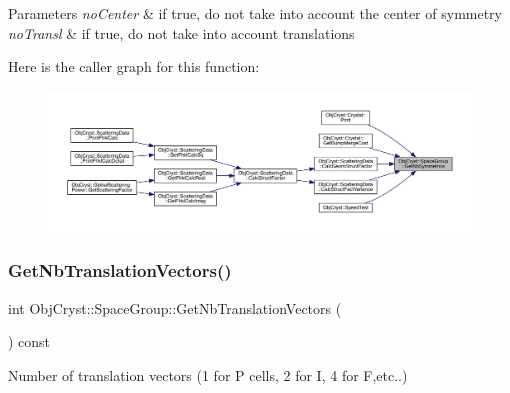 \begin{DoxyParams}{Parameters}
{\em no\+Center} & if \textquotesingle{}true\textquotesingle{}, do not take into account the center of symmetry \\
\hline
{\em no\+Transl} & if \textquotesingle{}true\textquotesingle{}, do not take into account translations \\
\hline
\end{DoxyParams}
Here is the caller graph for this function\+:
\nopagebreak
\begin{figure}[H]
\begin{center}
\leavevmode
\includegraphics[width=350pt]{class_obj_cryst_1_1_space_group_a3790c6c41b59e2584c48f62ab1766bec_icgraph}
\end{center}
\end{figure}
\mbox{\label{class_obj_cryst_1_1_space_group_ab29b2dbdb97ed82c9b609c7f59a3e656}} 
\subsubsection{\texorpdfstring{GetNbTranslationVectors()}{GetNbTranslationVectors()}}
{\footnotesize\ttfamily int Obj\+Cryst\+::\+Space\+Group\+::\+Get\+Nb\+Translation\+Vectors (\begin{DoxyParamCaption}{ }\end{DoxyParamCaption}) const}



Number of translation vectors (1 for \textquotesingle{}P\textquotesingle{} cells, 2 for \textquotesingle{}I\textquotesingle{}, 4 for \textquotesingle{}F\textquotesingle{},etc..) 


